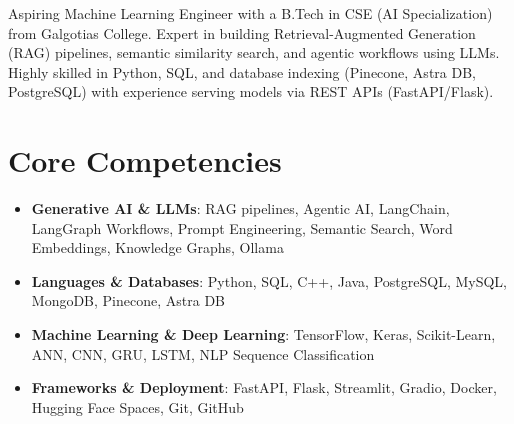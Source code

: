 \documentclass[11pt,a4paper,sans]{moderncv}
\begin{document}
\makecvtitle

\vspace{6pt}
\small{Aspiring Machine Learning Engineer with a B.Tech in CSE (AI Specialization) from Galgotias College. Expert in building Retrieval-Augmented Generation (RAG) pipelines, semantic similarity search, and agentic workflows using LLMs. Highly skilled in Python, SQL, and database indexing (Pinecone, Astra DB, PostgreSQL) with experience serving models via REST APIs (FastAPI/Flask).}

\section{Core Competencies}
\vspace{1pt}
\begin{itemize}
\item \textbf{Generative AI \& LLMs}: RAG pipelines, Agentic AI, LangChain, LangGraph Workflows, Prompt Engineering, Semantic Search, Word Embeddings, Knowledge Graphs, Ollama
\item \textbf{Languages \& Databases}: Python, SQL, C++, Java, PostgreSQL, MySQL, MongoDB, Pinecone, Astra DB
\item \textbf{Machine Learning \& Deep Learning}: TensorFlow, Keras, Scikit-Learn, ANN, CNN, GRU, LSTM, NLP Sequence Classification
\item \textbf{Frameworks \& Deployment}: FastAPI, Flask, Streamlit, Gradio, Docker, Hugging Face Spaces, Git, GitHub
\end{itemize}
\end{document}
